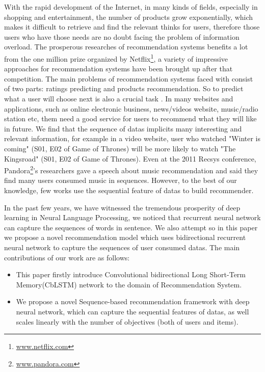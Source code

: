 \documentclass[runningheads]{llncs}
\begin{document}
With the rapid development of the Internet, in many kinds of fields, especially in shopping and entertainment, the number of products grow exponentially, which makes it difficult to retrieve and find the relevant thinks for users, therefore those users who have those needs are no doubt facing the problem of information overload. The prosperous researches of recommendation systems benefits a lot from the one million prize organized by Netflix\footnote{\url{www.netflix.com}}, a variety of impressive approaches for recommendation systems have been brought up after that competition. The main problems of recommendation systems faced with consist of two parts: ratings predicting and products recommendation. So to predict what a user will choose next is also a crucial task \cite{15}. In many websites and applications, such as online electronic business, news/videos website, music/radio station etc, them need a good service for users to recommend what they will like in future. We find that the sequence of datas implicits many interesting and relevant information, for example in a video website, user who watched "Winter is coming" (S01, E02 of Game of Thrones) will be more likely to watch "The Kingsroad" (S01, E02 of Game of Thrones). Even at the 2011 Recsys conference, Pandora\footnote{\url{www.pandora.com}}'s researchers gave a speech about music recommendation and said they find many users consumed music in sequences. However, to the best of our knowledge, few works use the sequential feature of datas to build recommender.

In the past few years, we have witnessed the tremendous prosperity of deep learning in Neural Language Processing, we noticed that recurrent neural network can capture the sequences of words in sentence. We also attempt  so in this paper we propose a novel recommendation model which uses bidirectional recurrent neural network to capture the sequences of user consumed datas. The main contributions of our work are as follows: 
 \begin{itemize}
\item This paper firstly introduce Convolutional bidirectional Long Short-Term Memory(CbLSTM) network to the domain of Recommendation System. 
\item We propose a novel Sequence-based recommendation framework with deep neural network, which can capture the sequential features of datas, as well scales linearly with the number of objectives (both of users and items).
 \end{itemize}
\end{document}
